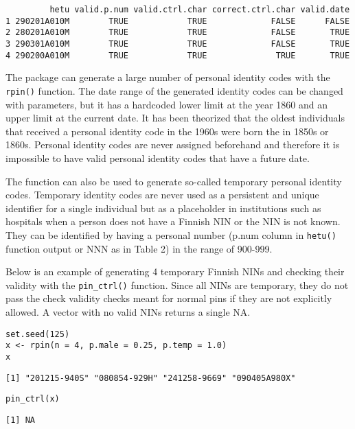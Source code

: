 \begin{verbatim}
         hetu valid.p.num valid.ctrl.char correct.ctrl.char valid.date
1 290201A010M        TRUE            TRUE             FALSE      FALSE
2 280201A010M        TRUE            TRUE             FALSE       TRUE
3 290301A010M        TRUE            TRUE             FALSE       TRUE
4 290200A010M        TRUE            TRUE              TRUE       TRUE
\end{verbatim}

The  package can generate a large number of personal identity codes with the \texttt{rpin()} function. The date range of the generated identity codes can be changed with parameters, but it has a hardcoded lower limit at the year 1860 and an upper limit at the current date. It has been theorized that the oldest individuals that received a personal identity code in the 1960s were born the in 1850s or 1860s. Personal identity codes are never assigned beforehand and therefore it is impossible to have valid personal identity codes that have a future date. \citep{salste2021}

The function can also be used to generate so-called temporary personal identity codes. Temporary identity codes are never used as a persistent and unique identifier for a single individual but as a placeholder in institutions such as hospitals when a person does not have a Finnish NIN or the NIN is not known. They can be identified by having a personal number (p.num column in \texttt{hetu()} function output or NNN as in Table 2) in the range of 900-999.

Below is an example of generating 4 temporary Finnish NINs and checking their validity with the \texttt{pin\_ctrl()} function. Since all NINs are temporary, they do not pass the check validity checks meant for normal pins if they are not explicitly allowed. A vector with no valid NINs returns a single NA.

\begin{verbatim}
set.seed(125)
x <- rpin(n = 4, p.male = 0.25, p.temp = 1.0)
x
\end{verbatim}

\begin{verbatim}
[1] "201215-940S" "080854-929H" "241258-9669" "090405A980X"
\end{verbatim}

\begin{verbatim}
pin_ctrl(x)
\end{verbatim}

\begin{verbatim}
[1] NA
\end{verbatim}

